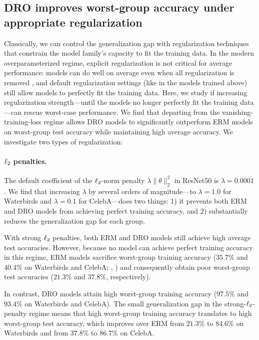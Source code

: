 \subsection{DRO improves worst-group accuracy under appropriate regularization}\label{sec:experiments_complexity_control}

Classically, we can control the generalization gap with regularization techniques that
constrain the model family's capacity to fit the training data.
In the modern overparameterized regime,
explicit regularization is not critical for average performance:
models can do well on average even when all regularization is removed \citep{zhang2017understanding},
and default regularization settings (like in the models trained above) still allow models to perfectly fit the training data.
Here, we study if increasing regularization strength---until the models no longer perfectly fit the training data---can rescue worst-case performance.
We find that departing from the vanishing-training-loss regime allows
DRO models to significantly outperform ERM models on worst-group test accuracy
while maintaining high average accuracy.
We investigate two types of regularization:

\paragraph{$\ell_2$ penalties.}
The default coefficient of the $\ell_2$-norm penalty $\lambda \|\theta\|_2^2$ in ResNet50 is $\lambda = 0.0001$ \citep{he2016resnet}.
We find that increasing $\lambda$ by several orders of magnitude---to $\lambda = 1.0$ for Waterbirds and $\lambda = 0.1$ for CelebA---does two things: 1) it prevents both ERM and DRO models from achieving perfect training accuracy, and 2) substantially reduces the generalization gap for each group.

With strong $\ell_2$ penalties, both ERM and DRO models still achieve high average test accuracies.
However, because no model can achieve perfect training accuracy in this regime,
ERM models sacrifice worst-group training accuracy
($35.7\%$ and $40.4\%$ on Waterbirds and CelebA; , ) and consequently obtain poor worst-group test accuracies ($21.3\%$ and $37.8\%$, respectively).

In contrast,
DRO models attain high worst-group training accuracy ($97.5\%$ and $93.4\%$ on Waterbirds and CelebA).
The small generalization gap in the strong-$\ell_2$-penalty regime means that high worst-group training accuracy translates to high worst-group test accuracy,
which improves over ERM from $21.3\%$ to $84.6 \%$ on Waterbirds
and from $37.8\%$ to $86.7\%$ on CelebA.

